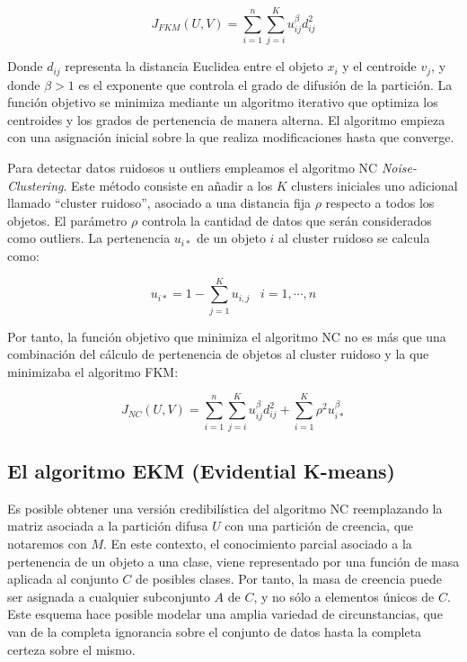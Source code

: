 \begin{equation}
J_{FKM}(U,V) = \sum_{i=1}^{n}\sum_{j=i}^{K} u_{ij}^\beta d_{ij}^2
\label{eqn8}
\end{equation}

Donde $d_{ij}$ representa la distancia Euclidea entre el objeto $x_i$ y el centroide $v_j$, y donde $\beta > 1$ es el exponente que controla el grado de difusión de la partición. La función objetivo se minimiza mediante un algoritmo iterativo que optimiza los centroides y los grados de pertenencia de manera alterna. El algoritmo empieza con una asignación inicial sobre la que realiza modificaciones hasta que converge.

Para detectar datos ruidosos u outliers empleamos el algoritmo \acs{NC} \textit{Noise-Clustering}. Este método consiste en añadir a los $K$ clusters iniciales uno adicional llamado ``cluster ruidoso'', asociado a una distancia fija $\rho$ respecto a todos los objetos. El parámetro $\rho$ controla la cantidad de datos que serán considerados como outliers. La pertenencia $u_{i*}$ de un objeto $i$ al cluster ruidoso se calcula como:

\begin{equation}
u_{i*} = 1 - \sum_{j=1}^{K} u_{i,j} \;\;\; i = {1,\cdots,n}
\label{eqn9}
\end{equation}

Por tanto, la función objetivo que minimiza el algoritmo \acs{NC} no es más que una combinación del cálculo de pertenencia de objetos al cluster ruidoso y la que minimizaba el algoritmo \acs{FKM}:

\begin{equation}
J_{NC}(U,V) = \sum_{i=1}^{n}\sum_{j=i}^{K} u_{ij}^\beta d_{ij}^2 + \sum_{i=1}^{K} \rho^2 u_{i*}^\beta
\label{eqn10}
\end{equation}

\subsection{El algoritmo EKM (Evidential K-means)}

Es posible obtener una versión credibilística del algoritmo \acs{NC} reemplazando la matriz asociada a la partición difusa $U$ con una partición de creencia, que notaremos con $M$. En este contexto, el conocimiento parcial asociado a la pertenencia de un objeto a una clase, viene representado por una función de masa aplicada al conjunto $C$ de posibles clases. Por tanto, la masa de creencia puede ser asignada a cualquier subconjunto $A$ de $C$, y no sólo a elementos únicos de $C$. Este esquema hace posible modelar una amplia variedad de circunstancias, que van de la completa ignorancia sobre el conjunto de datos hasta la completa certeza sobre el mismo.

